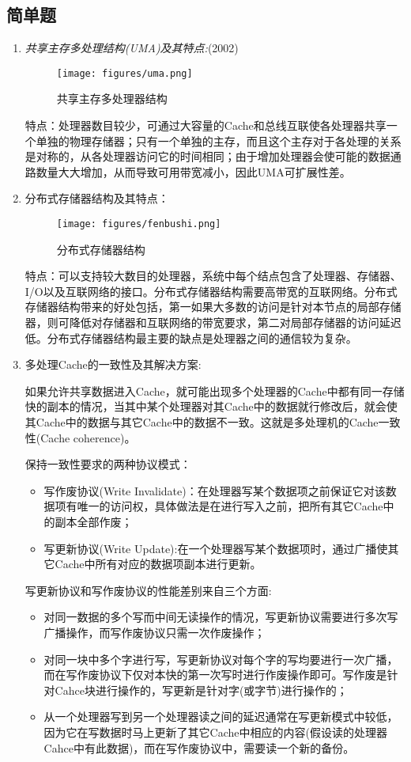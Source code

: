 \documentclass[a4paper]{ctexart}
\begin{document}
\subsection{简单题}
\begin{enumerate}
  \item {\color{grey}\emph{共享主存多处理结构(UMA)及其特点:}(2002)
  \begin{figure}[!htbp]
    \caption{共享主存多处理器结构}
    \centering
    \texttt{[image: figures/uma.png]}
  \end{figure}
  
  特点：处理器数目较少，可通过大容量的Cache和总线互联使各处理器共享一个单独的物理存储器；只有一个单独的主存，而且这个主存对于各处理的关系是对称的，从各处理器访问它的时间相同；由于增加处理器会使可能的数据通路数量大大增加，从而导致可用带宽减小，因此UMA可扩展性差。}
  \item {\color{grey}分布式存储器结构及其特点：
  \begin{figure}[!htbp]
    \caption{分布式存储器结构}
    \centering
    \texttt{[image: figures/fenbushi.png]}
  \end{figure}
  
  特点：可以支持较大数目的处理器，系统中每个结点包含了处理器、存储器、I/O以及互联网络的接口。分布式存储器结构需要高带宽的互联网络。分布式存储器结构带来的好处包括，第一如果大多数的访问是针对本节点的局部存储器，则可降低对存储器和互联网络的带宽要求，第二对局部存储器的访问延迟低。分布式存储器结构最主要的缺点是处理器之间的通信较为复杂。}

  \item 多处理Cache的一致性及其解决方案:
  
  如果允许共享数据进入Cache，就可能出现多个处理器的Cache中都有同一存储快的副本的情况，当其中某个处理器对其Cache中的数据就行修改后，就会使其Cache中的数据与其它Cache中的数据不一致。这就是多处理机的Cache一致性(Cache coherence)。
  
  保持一致性要求的两种协议模式：
  \begin{itemize}
    \item 写作废协议(Write Invalidate)：在处理器写某个数据项之前保证它对该数据项有唯一的访问权，具体做法是在进行写入之前，把所有其它Cache中的副本全部作废；
    \item 写更新协议(Write Update):在一个处理器写某个数据项时，通过广播使其它Cache中所有对应的数据项副本进行更新。
  \end{itemize}
  写更新协议和写作废协议的性能差别来自三个方面:
  \begin{itemize}
    \item 对同一数据的多个写而中间无读操作的情况，写更新协议需要进行多次写广播操作，而写作废协议只需一次作废操作；
    \item 对同一块中多个字进行写，写更新协议对每个字的写均要进行一次广播，而在写作废协议下仅对本快的第一次写时进行作废操作即可。写作废是针对Cahce块进行操作的，写更新是针对字(或字节)进行操作的；
    \item 从一个处理器写到另一个处理器读之间的延迟通常在写更新模式中较低，因为它在写数据时马上更新了其它Cache中相应的内容(假设读的处理器Cahce中有此数据)，而在写作废协议中，需要读一个新的备份。
  \end{itemize}
  

\end{enumerate}
\end{document}
